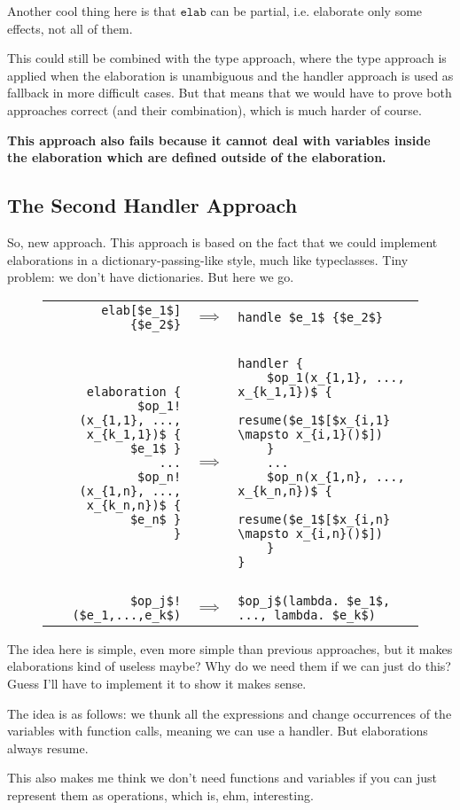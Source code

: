 \documentclass{article}
\newcommand\kw[1]{\ensuremath{\mathbf{\mathtt{#1}}}}
\newcommand\elab{\kw{elab}}
\begin{document}
Another cool thing here is that $\elab$ can be partial, i.e. elaborate only some effects, not all of them.

This could still be combined with the type approach, where the type approach is applied when the elaboration is unambiguous and the handler approach is used as fallback in more difficult cases. But that means that we would have to prove both approaches correct (and their combination), which is much harder of course.

\textbf{This approach also fails because it cannot deal with variables inside the elaboration which are defined outside of the elaboration.}

\subsection{The Second Handler Approach}

So, new approach. This approach is based on the fact that we could implement elaborations in a dictionary-passing-like style, much like typeclasses. Tiny problem: we don't have dictionaries. But here we go.

\begin{figure}[H]
\begin{tabular}{rcl}
\lstinline|elab[$e_1$] {$e_2$}|
& $\implies$
& \lstinline|handle $e_1$ {$e_2$}|
\\\\
\begin{lstlisting}
elaboration {
    $op_1!(x_{1,1}, ..., x_{k_1,1})$ { $e_1$ }
    ...
    $op_n!(x_{1,n}, ..., x_{k_n,n})$ { $e_n$ }
}
\end{lstlisting}
&$\implies$
&\begin{lstlisting}
handler {
    $op_1(x_{1,1}, ..., x_{k_1,1})$ {
        resume($e_1$[$x_{i,1} \mapsto x_{i,1}()$])
    }
    ...
    $op_n(x_{1,n}, ..., x_{k_n,n})$ {
        resume($e_1$[$x_{i,n} \mapsto x_{i,n}()$])
    }
}
\end{lstlisting}
\\\\
\lstinline|$op_j$!($e_1,...,e_k$)|
& $\implies$
& \lstinline|$op_j$(lambda. $e_1$, ..., lambda. $e_k$)|
\end{tabular}
\end{figure}

The idea here is simple, even more simple than previous approaches, but it makes elaborations kind of useless maybe? Why do we need them if we can just do this? Guess I'll have to implement it to show it makes sense.

The idea is as follows: we thunk all the expressions and change occurrences of the variables with function calls, meaning we can use a handler. But elaborations always resume.

This also makes me think we don't need functions and variables if you can just represent them as operations, which is, ehm, interesting.
\end{document}
